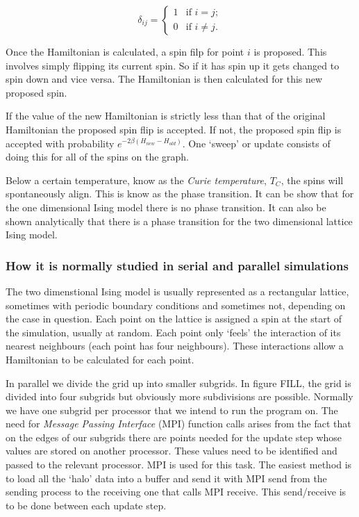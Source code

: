\documentclass[pdftex,12pt,a4paper]{article}
\begin{document}
\[ \delta_{ij} = \left\{ \begin{array}{ll}
         1 & \mbox{if $i = j$};\\
        0 & \mbox{if $i \neq j$}.\end{array} \right. \]

Once the Hamiltonian is calculated, a spin filp for point $i$ is proposed. This involves simply flipping its current spin. So if it has spin up it gets changed to spin down and vice versa. The Hamiltonian is then calculated for this new proposed spin.

If the value of the new Hamiltonian is strictly less than that of the original Hamiltonian the proposed spin flip is accepted. If not, the proposed spin flip is accepted with probability $e^{-2 \beta (H_{new} - H_{old})}$. One `sweep' or update consists of doing this for all of the spins on the graph.

Below a certain temperature, know as the \emph{Curie temperature}, $T_C$, the spins will spontaneously align. This is know as the phase transition. It can be show that for the one dimensional Ising model there is no phase transition. It can also be shown analytically that there is a phase transition for the two dimensional lattice Ising model.



\subsubsection{How it is normally studied in serial and parallel simulations}

The two dimenstional Ising model is usually represented as a rectangular lattice, sometimes with periodic boundary conditions and sometimes not, depending on the case in question. Each point on the lattice is assigned a spin at the start of the simulation, usually at random. Each point only `feels' the interaction of its nearest neighbours (each point has four neighbours). These interactions allow a Hamiltonian to be calculated for each point.

In parallel we divide the grid up into smaller subgrids. In figure FILL, the grid is divided into four subgrids but obviously more subdivisions are possible. Normally we have one subgrid per processor that we intend to run the program on. The need for \emph{Message Passing Interface} (MPI) function calls arises from the fact that on the edges of our subgrids there are points needed for the update step whose values are stored on another processor. These values need to be identified and passed to the relevant processor. MPI is used for this task. The easiest method is to load all the `halo' data into a buffer and send it with MPI send from the sending process to the receiving one that calls MPI receive. This send/receive is to be done between each update step.
\end{document}
